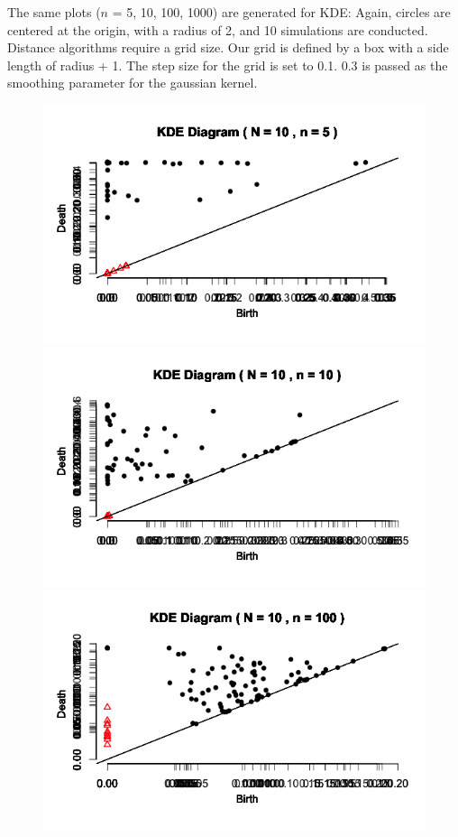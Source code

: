 \documentclass[a4paper]{article}
\begin{document}
\noindent The same plots ($n$ = 5, 10, 100, 1000) are generated for KDE: Again, circles are centered at the origin, with a radius of 2, and 10 simulations are conducted. Distance algorithms require a grid size. Our grid is defined by a box with a side length of radius + 1. The step size for the grid is set to 0.1. 0.3 is passed as the smoothing parameter for the gaussian kernel.  \newline

\begin{figure}[!htb]
  \includegraphics[width=\linewidth]{KDE_n5.png}
\endminipage\hfill
{}
  \includegraphics[width=\linewidth]{KDE_n10.png}
\endminipage\hfill
{}
  \includegraphics[width=\linewidth]{KDE_n100.png}

\end{figure}
\end{document}
